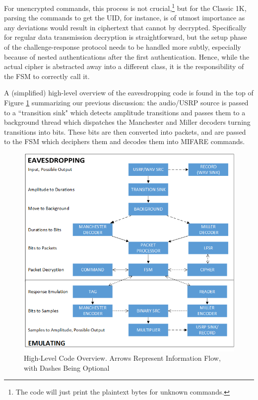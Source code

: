 \documentclass[fleqn,10pt]{SelfArx} %
\begin{document}
For unencrypted commands, this process is not crucial,\footnote{The code will just print the plaintext bytes for unknown commands.} but for the Classic 1K, parsing the commands to get the UID, for instance, is of utmost importance as any deviations would result in ciphertext that cannot by decrypted. Specifically for regular data transmission decryption is straightforward, but the setup phase of the challenge-response protocol needs to be handled more subtly, especially because of nested authentications after the first authentication. Hence, while the actual cipher is abstracted away into a different class, it is the responsibility of the FSM to correctly call it.

A (simplified) high-level overview of the eavesdropping code is found in the top of Figure \ref{fig:code} summarizing our previous discussion: the audio/USRP source is passed to a ``transition sink" which detects amplitude transitions and passes them to a background thread which dispatches the Manchester and Miller decoders turning transitions into bits. These bits are then converted into packets, and are passed to the FSM which deciphers them and decodes them into MIFARE commands.


\begin{figure}[tp]
  \includegraphics[width=\linewidth]{img/code}
  \caption{High-Level Code Overview. Arrows Represent Information Flow, with Dashes Being Optional}
  \label{fig:code}
\end{figure}
\end{document}
